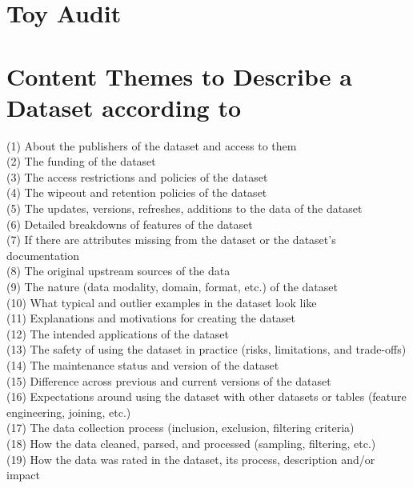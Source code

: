 \clearpage

\section{Toy Audit}
\label{app:audit}



\newpage
\section{Content Themes to Describe a Dataset according to \citet{Gebru2021_DataSheets}}
\label{app:datasheets_content_themes}
(1) About the publishers of the dataset and access to them \\
(2) The funding of the dataset \\
(3) The access restrictions and policies of the dataset \\
(4) The wipeout and retention policies of the dataset \\
(5) The updates, versions, refreshes, additions to the data of the dataset\\
(6) Detailed breakdowns of features of the dataset \\
(7) If there are attributes missing from the dataset or the dataset’s documentation\\
(8) The original upstream sources of the data \\
(9) The nature (data modality, domain, format, etc.) of the dataset\\
(10) What typical and outlier examples in the dataset look like\\
(11) Explanations and motivations for creating the dataset \\
(12) The intended applications of the dataset \\
(13) The safety of using the dataset in practice (risks, limitations, and trade-offs)\\
(14) The maintenance status and version of the dataset \\
(15) Difference across previous and current versions of the dataset\\
(16) Expectations around using the dataset with other datasets or tables (feature engineering, joining, etc.)\\
(17) The data collection process (inclusion, exclusion, filtering criteria)\\
(18) How the data cleaned, parsed, and processed (sampling, filtering, etc.)\\
(19) How the data was rated in the dataset, its process, description and/or impact\\
